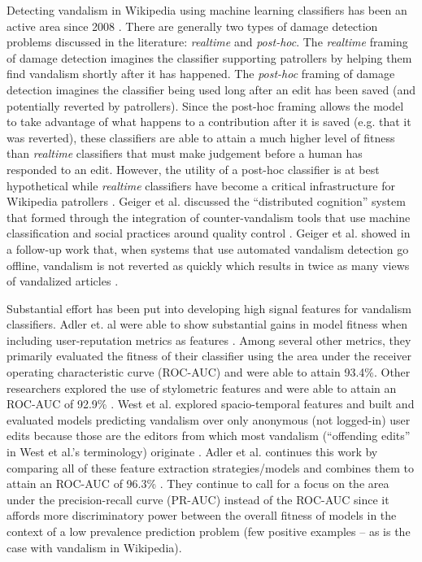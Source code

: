 \documentclass{sig-alternate-2013}
\begin{document}
Detecting vandalism in Wikipedia using machine learning classifiers has been an active area since 2008 \cite{smets:automatic}. There are generally two types of damage detection problems discussed in the literature: \textit{realtime} and \textit{post-hoc}.  The \textit{realtime} framing of damage detection imagines the classifier supporting patrollers by helping them find vandalism shortly after it has happened.  The \textit{post-hoc} framing of damage detection imagines the classifier being used long after an edit has been saved (and potentially reverted by patrollers).  Since the post-hoc framing allows the model to take advantage of what happens to a contribution after it is saved (e.g. that it was reverted), these classifiers are able to attain a much higher level of fitness than \textit{realtime} classifiers that must make judgement before a human has responded to an edit.  However, the utility of a post-hoc classifier is at best hypothetical while \textit{realtime} classifiers have become a critical infrastructure for Wikipedia patrollers \cite{geiger:work, geiger:levee}.  Geiger et al. discussed the ``distributed cognition'' system that formed through the integration of counter-vandalism tools that use machine classification and social practices around quality control \cite{geiger:work}.  Geiger et al. showed in a follow-up work that, when systems that use automated vandalism detection go offline, vandalism is not reverted as quickly which results in twice as many views of vandalized articles \cite{geiger:levee}.

Substantial effort has been put into developing high signal features for vandalism classifiers.  Adler et. al were able to show substantial gains in model fitness when including user-reputation metrics as features \cite{adler:detecting}. Among several other metrics, they primarily evaluated the fitness of their classifier using the area under the receiver operating characteristic curve (ROC-AUC) and were able to attain 93.4\%. Other researchers explored the use of stylometric features and were able to attain an ROC-AUC of 92.9\% \cite{wang:got,harpalani:language}.  West et al. explored spacio-temporal features and built and evaluated models predicting vandalism over only anonymous (not logged-in) user edits because those are the editors from which most vandalism (``offending edits'' in West et al.'s terminology) originate \cite{west:detecting}.  Adler et al. continues this work by comparing all of these feature extraction strategies/models and combines them to attain an ROC-AUC of 96.3\% \cite{adler:wikipedia}.  They continue to call for a focus on the area under the precision-recall curve (PR-AUC) instead of the ROC-AUC since it affords more discriminatory power between the overall fitness of models in the context of a low prevalence prediction problem (few positive examples -- as is the case with vandalism in Wikipedia).
\end{document}
